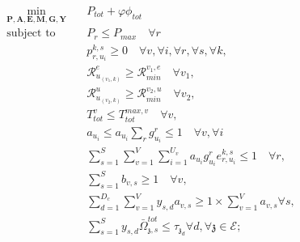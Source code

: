 \documentclass[conference]{IEEEtran}
\begin{document}
\begin{subequations}
\begin{alignat}{4}
\min\limits_{\boldsymbol{P}, \boldsymbol{A}, \boldsymbol{E}, \boldsymbol{M}, \boldsymbol{G}, \boldsymbol{Y} }   \quad &  P_{tot}+ \varphi \phi_{tot} \ \\
\text{subject to} \quad  &  P_r \leq P_{max} \quad \forall r
 \label{c11} \\
&p_{r,u_i}^{k,s}  \geq 0  \quad \forall v,\forall i,\forall r,\forall s, \forall k,\label{c12} \\
&\mathcal{R}_{u_{(v_1,k)}}^e \geq  \mathcal{R}_{min}^{v_1,e} \quad \forall v_1, \label{c13} \\
&\mathcal{R}_{u_{(v_2,k)}}^u \geq  \mathcal{R}_{min}^{v_2,u} \quad \forall v_2, \label{c14} \\
&T_{tot}^v \leq T_{tot}^{max,v} \quad \forall v,\label{c15} \\
&a_{u_i} \leq a_{u_i}\sum_{r}g^r_{u_i} \leq 1 \quad \forall v,\forall i  \\
& \sum_{s=1}^{S}\sum_{v=1}^{V}\sum_{i=1}^{U_v}a_{u_i}g^r_{u_i}e^{k,s}_{r,u_i} \leq 1 \quad \forall r, \label{c21} \\
&  \sum_{s=1}^{S}b_{v,s} \geq 1 \quad \forall v,\\
& \textstyle  \sum_{d=1}^{D_c}\sum_{v=1}^{V}y_{s,d}a_{v,s} \geq 1\times\sum_{v=1}^{V}a_{v,s} \forall s,\label{c23} \\
 &\textstyle \sum_{s=1}^{S} y_{s,d} \bar{\Omega}_{\mathfrak{z},s}^{tot}  \leq   \tau_{\mathfrak{z}_d}  \forall d, \forall \mathfrak{z}\in \mathcal{E}; \label{c22}
\end{alignat}
\label{constraints}
\end{subequations}





\end{document}
